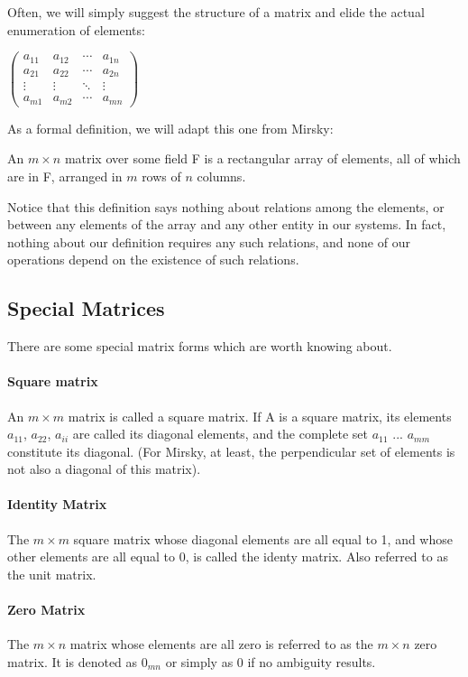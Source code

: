 \documentclass[12pt,letterpaper,final]{article}
\begin{document}
Often, we will simply suggest the structure of a matrix and elide the actual enumeration of elements:

$
 \begin{pmatrix}
  a_{11} & a_{12} & \cdots & a_{1n} \\
  a_{21} & a_{22} & \cdots & a_{2n} \\
  \vdots  & \vdots  & \ddots & \vdots  \\
  a_{m1} & a_{m2} & \cdots & a_{mn}
 \end{pmatrix}
$


As a formal definition, we will adapt this one from Mirsky:

An $m \times n$ matrix over some field F is a rectangular array of elements, all of which are in F, arranged in $m$ rows of $n$ columns. 

Notice that this definition says nothing about relations among the elements, or between any elements of the array and any other entity in our systems. In fact, nothing about our definition requires any such relations, and none of our operations depend on the existence of such relations. 

\subsection{Special Matrices}
There are some special matrix forms which are worth knowing about. 
\paragraph{Square matrix} An $m \times m$ matrix is called a square matrix. If A is a square matrix, its elements$a_{11}$, $a_{22}$, $a_{ii}$ are called its diagonal elements, and the complete set $a_{11}$ ... $a_{mm}$ constitute its diagonal. (For Mirsky, at least, the perpendicular set of elements is not also a diagonal of this matrix). 

\paragraph{Identity Matrix} The $m \times m$ square matrix whose  diagonal elements are all equal to 1, and whose other elements are all equal to 0, is called the identy matrix. Also referred to as the unit matrix. 

\paragraph{Zero Matrix} The $m \times n$ matrix whose elements are all zero is referred to as the $m \times n$ zero matrix. It is denoted as $0_{mn}$ or simply as 0 if no ambiguity results. 
\end{document}
